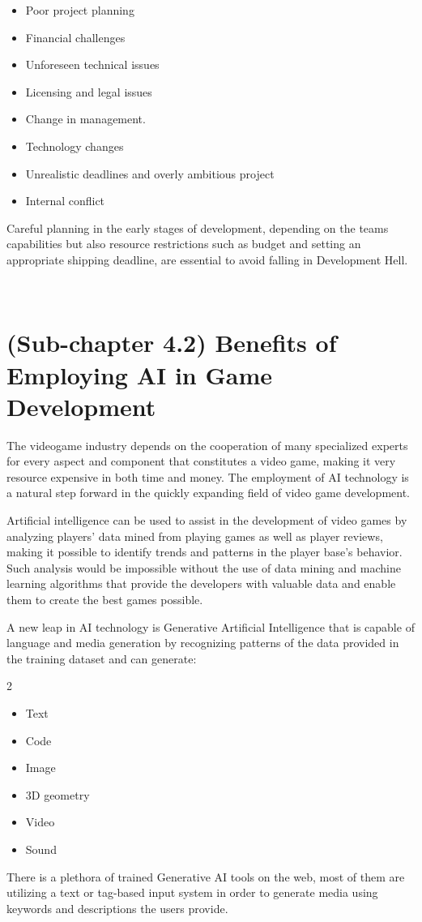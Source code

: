 \documentclass[a4paper,one side,12pt]{book}
\begin{document}
\begin{itemize}
\item
  Poor project planning
\item
  Financial challenges
\item
  Unforeseen technical issues
\item
  Licensing and legal issues
\item
  Change in management.
\item
  Technology changes
\item
  Unrealistic deadlines and overly ambitious project
\item
  Internal conflict
\end{itemize}

Careful planning in the early stages of development, depending on the
team\textquotesingle s capabilities but also resource restrictions such
as budget and setting an appropriate shipping deadline, are essential to
avoid falling in Development Hell.

\
\section{(Sub-chapter 4.2) Benefits of Employing AI in Game Development}

The videogame industry depends on the cooperation of many specialized
experts for every aspect and component that constitutes a video game,
making it very resource expensive in both time and money. The employment
of AI technology is a natural step forward in the quickly expanding
field of video game development.

Artificial intelligence can be used to assist in the development of
video games by analyzing players' data mined from playing games as well
as player reviews, making it possible to identify trends and patterns in
the player base's behavior. Such analysis would be impossible without
the use of data mining and machine learning algorithms that provide the
developers with valuable data and enable them to create the best games
possible.

A new leap in AI technology is Generative Artificial Intelligence that
is capable of language and media generation by recognizing patterns of
the data provided in the training dataset and can generate:
\begin{multicols}{2}
\begin{itemize}
  \item Text     
  \item Code 
  \item Image	
  \item 3D geometry
  \item Video 
  \item Sound 
  
  \end{itemize}
\end{multicols}
There is a plethora of trained Generative AI tools on the web, most of
them are utilizing a text or tag-based input system in order to generate
media using keywords and descriptions the users provide.
\end{document}
